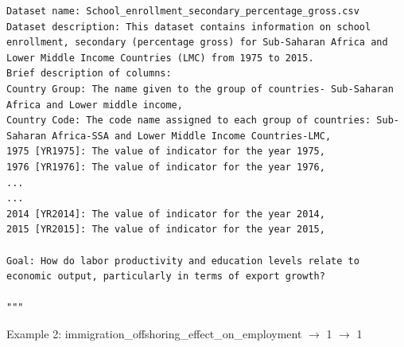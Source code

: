 \begin{verbatim}
Dataset name: School_enrollment_secondary_percentage_gross.csv
Dataset description: This dataset contains information on school enrollment, secondary (percentage gross) for Sub-Saharan Africa and Lower Middle Income Countries (LMC) from 1975 to 2015.
Brief description of columns:
Country Group: The name given to the group of countries- Sub-Saharan Africa and Lower middle income,
Country Code: The code name assigned to each group of countries: Sub-Saharan Africa-SSA and Lower Middle Income Countries-LMC,
1975 [YR1975]: The value of indicator for the year 1975,
1976 [YR1976]: The value of indicator for the year 1976,
...
...
2014 [YR2014]: The value of indicator for the year 2014,
2015 [YR2015]: The value of indicator for the year 2015,

Goal: How do labor productivity and education levels relate to economic output, particularly in terms of export growth?

"""
\end{verbatim}

Example 2:  immigration\_offshoring\_effect\_on\_employment $\rightarrow$ 1 $\rightarrow$ 1

